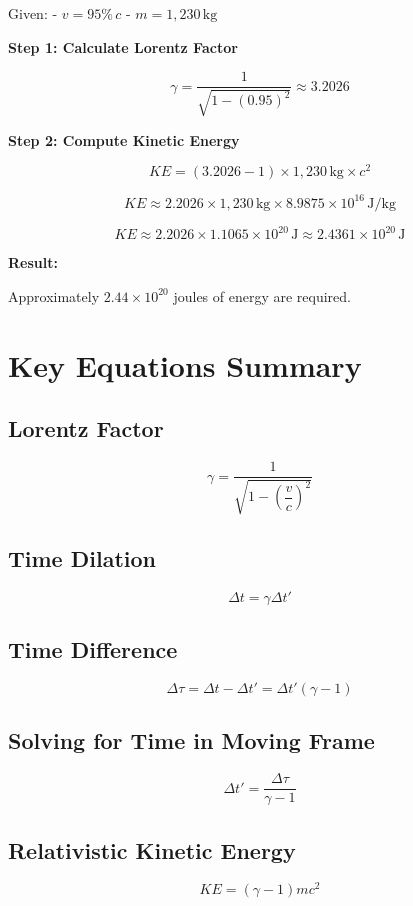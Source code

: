 \documentclass{article}
\begin{document}
\begin{multicols}{2}
Given:
- \( v = 95\% \, c \)
- \( m = 1{,}230\, \text{kg} \)

\textbf{Step 1: Calculate Lorentz Factor}

\[
\gamma = \frac{1}{\sqrt{1 - (0.95)^2}} \approx 3.2026
\]

\textbf{Step 2: Compute Kinetic Energy}

\[
KE = (3.2026 - 1) \times 1{,}230\, \text{kg} \times c^2
\]

\[
KE \approx 2.2026 \times 1{,}230\, \text{kg} \times 8.9875 \times 10^{16}\, \text{J/kg}
\]

\[
KE \approx 2.2026 \times 1.1065 \times 10^{20}\, \text{J} \approx 2.4361 \times 10^{20}\, \text{J}
\]

\textbf{Result:}

Approximately \( 2.44 \times 10^{20} \) joules of energy are required.

\section*{Key Equations Summary}

\subsection*{Lorentz Factor}

\[
\gamma = \frac{1}{\sqrt{1 - \left( \dfrac{v}{c} \right)^2 }}
\]

\subsection*{Time Dilation}

\[
\Delta t = \gamma \Delta t'
\]

\subsection*{Time Difference}

\[
\Delta \tau = \Delta t - \Delta t' = \Delta t' (\gamma - 1)
\]

\subsection*{Solving for Time in Moving Frame}

\[
\Delta t' = \frac{\Delta \tau}{\gamma - 1}
\]

\subsection*{Relativistic Kinetic Energy}

\[
KE = (\gamma - 1) m c^2
\]

\end{multicols}
\end{document}
